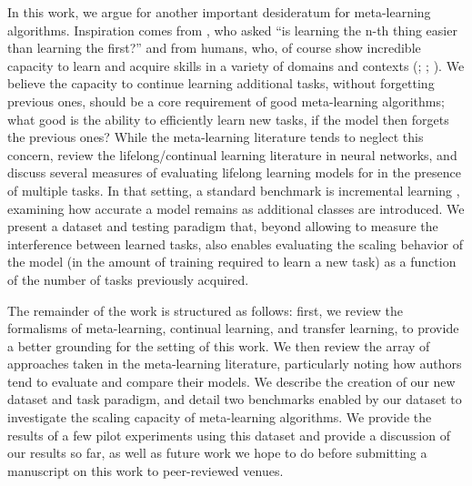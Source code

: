 In this work, we argue for another important desideratum for meta-learning algorithms. Inspiration comes from \textcite{Thrun1996}, who asked “is learning the n-th thing easier than learning the first?” and from humans, who, of course show incredible capacity to learn and acquire skills in a variety of domains and contexts (\cite{Brown1988a}; \cite{Green2008}; \cite{Krakauer2011}). We believe the capacity to continue learning additional tasks, without forgetting previous ones, should be a core requirement of good meta-learning algorithms; what good is the ability to efficiently learn new tasks, if the model then forgets the previous ones? While the meta-learning literature tends to neglect this concern, \textcite{Parisi2019} review the lifelong/continual learning \parencite{Thrun1995} literature in neural networks, and discuss several measures of evaluating lifelong learning models for in the presence of multiple tasks. In that setting, a standard benchmark is incremental learning \parencite{Kemker2017a}, examining how accurate a model remains as additional classes are introduced. We present a dataset and testing paradigm that, beyond allowing to measure the interference between learned tasks, also enables evaluating the scaling behavior of the model (in the amount of training required to learn a new task) as a function of the number of tasks previously acquired.  

The remainder of the work is structured as follows: first, we review the formalisms of meta-learning, continual learning, and transfer learning, to provide a better grounding for the setting of this work. We then review the array of approaches taken in the meta-learning literature, particularly noting how authors tend to evaluate and compare their models. We describe the creation of our new dataset and task paradigm, and detail two benchmarks enabled by our dataset to investigate the scaling capacity of meta-learning algorithms. We provide the results of a few pilot experiments using this dataset and provide a discussion of our results so far, as well as future work we hope to do before submitting a manuscript on this work to peer-reviewed venues. 

